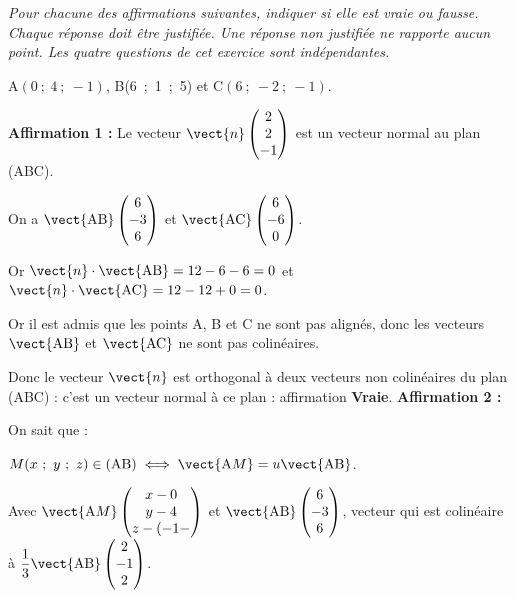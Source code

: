 \medskip

\emph{Pour chacune des affirmations suivantes, indiquer si elle est vraie ou fausse. Chaque réponse doit être justifiée. Une réponse non justifiée ne rapporte aucun point.
Les quatre questions de cet exercice sont indépendantes.}

\medskip


\begin{center}A$(0~;~ 4~;~-1)$, \quad B(6~;~1~;~5) \quad et \quad C$(6~;~-2~;~-1)$.\end{center} 



\medskip

\textbf{Affirmation 1 :} Le vecteur $\vect{n}\begin{pmatrix}2\\2\\-1\end{pmatrix}$ est un vecteur normal au plan (ABC).

\medskip

On a $\vect{\text{AB}}\begin{pmatrix}6\\-3\\6\end{pmatrix}$ et $\vect{\text{AC}}\begin{pmatrix}6\\-6\\0\end{pmatrix}$.

Or  $\vect{n} \cdot \vect{\text{AB}} = 12 - 6 - 6 = 0$ et $\vect{n} \cdot \vect{\text{AC}} = 12 - 12  + 0  = 0$.

Or il est admis que les points A, B et C ne sont pas alignés, donc les vecteurs $\vect{\text{AB}}$ et $\vect{\text{AC}}$ ne sont pas colinéaires.

Donc le vecteur $\vect{n}$ est orthogonal à deux vecteurs non colinéaires du plan (ABC) : c'est un vecteur normal à ce plan : affirmation \textbf{Vraie}.
\textbf{Affirmation 2 :} 






On sait que :

$M(x~;~y~;~z) \in (\text{AB}) \iff \vect{\text{A}M} = u\vect{\text{AB}}$.

Avec $\vect{\text{A}M}\begin{pmatrix}x - 0\\y - 4\\z - (-1-\end{pmatrix}$ et $\vect{\text{AB}}\begin{pmatrix}6\\-3\\6\end{pmatrix}$, vecteur qui est colinéaire à $\dfrac13\vect{\text{AB}}\begin{pmatrix}2\\-1\\2\end{pmatrix}$.

